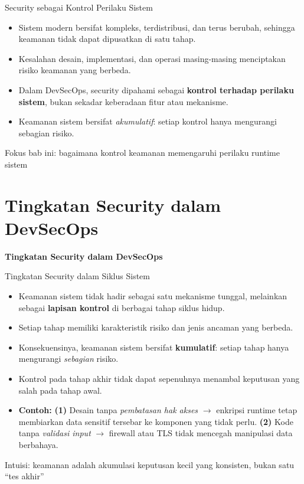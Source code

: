 \documentclass[aspectratio=169, table]{beamer}
\begin{document}
\begin{frame}{Security sebagai Kontrol Perilaku Sistem}
	\vspace{10pt}
	\begin{itemize}
		\item Sistem modern bersifat kompleks, terdistribusi, dan terus berubah, sehingga keamanan tidak dapat dipusatkan di satu tahap.
		\item Kesalahan desain, implementasi, dan operasi masing-masing menciptakan risiko keamanan yang berbeda.
		\item Dalam DevSecOps, security dipahami sebagai \textbf{kontrol terhadap perilaku sistem}, bukan sekadar keberadaan fitur atau mekanisme.
		\item Keamanan sistem bersifat \emph{akumulatif}: setiap kontrol hanya mengurangi sebagian risiko.
	\end{itemize}
	
	\vspace{6pt}
	{\footnotesize Fokus bab ini: bagaimana kontrol keamanan memengaruhi perilaku runtime sistem}
\end{frame}


\section{Tingkatan Security dalam DevSecOps}

	\begin{frame}{\hfill}
		\centering
		\Huge{\textbf{Tingkatan Security dalam DevSecOps}}
	\end{frame}

\begin{frame}{Tingkatan Security dalam Siklus Sistem}
	\vspace{10pt}
	\begin{itemize}
		\item Keamanan sistem tidak hadir sebagai satu mekanisme tunggal, melainkan sebagai \textbf{lapisan kontrol} di berbagai tahap siklus hidup.
		\item Setiap tahap memiliki karakteristik risiko dan jenis ancaman yang berbeda.
		\item Konsekuensinya, keamanan sistem bersifat \textbf{kumulatif}:
		      setiap tahap hanya mengurangi \emph{sebagian} risiko.
		\item Kontrol pada tahap akhir tidak dapat sepenuhnya menambal keputusan yang salah pada tahap awal.
		\item \textbf{Contoh:}
		      \textbf{(1)} Desain tanpa \emph{pembatasan hak akses}
		      $\rightarrow$ enkripsi runtime tetap membiarkan data sensitif tersebar ke komponen yang tidak perlu.
		      \textbf{(2)} Kode tanpa \emph{validasi input}
		      $\rightarrow$ firewall atau TLS tidak mencegah manipulasi data berbahaya.
	\end{itemize}
	
	\vspace{4pt}
	{\footnotesize Intuisi: keamanan adalah akumulasi keputusan kecil yang konsisten, bukan satu ``tes akhir''}
\end{frame}
\end{document}
